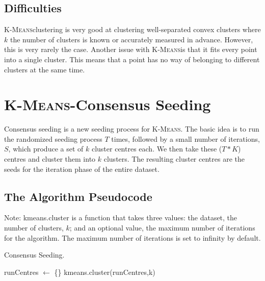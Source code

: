 \documentclass[12pt]{dalthesis}
\newcommand*{\kmeansn}{\textsc{K-Means}} %
\newcommand*{\kmeans}{\kmeansn } %
\begin{document}
\section{Difficulties}

\kmeans clustering is very good at clustering well-separated convex clusters where $k$ the number of clusters is known or accurately measured in advance. However, this is very rarely the case. Another issue with \kmeans is that it fits every point into a single cluster. This means that a point has no way of belonging to different clusters at the same time. 


\chapter{\kmeansn-Consensus Seeding}

Consensus seeding is a new seeding process for \kmeansn. The basic idea is to run the randomized seeding process $T$ times, followed by a small number of iterations, $S$, which produce a set of $k$ cluster centres each. We then take these ($T*K$) centres and cluster them into $k$ clusters. The resulting cluster centres are the seeds for the iteration phase of the entire dataset.


\section{The Algorithm Pseudocode}

Note: kmeans.cluster is a function that takes three values: the dataset, the number of clusters, $k$; and an optional value, the maximum number of iterations for the algorithm. The maximum number of iterations is set to infinity by default. \\

\begin{algorithm}[H]
  \caption{Consensus Seeding.}
  \SetAlgoLined
  \BlankLine
  \BlankLine
  runCentres $\leftarrow$ \{\}\;
  \Return kmeans.cluster(runCentres,k)
\end{algorithm}
\end{document}
